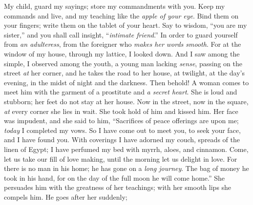 \begin{biblechapter} %
 My child, guard my sayings; 
store my commandments with you.
\verse Keep my commands and live, 
and my teaching like the \textit{apple of your eye}.
\verse Bind them on your fingers; 
write them on the tablet of your heart.
\verse Say to wisdom, “you are my sister,” 
and you shall call insight, “\textit{intimate friend}.”
\verse In order to guard yourself from \textit{an adulteress}, 
from the foreigner who \textit{makes her words smooth}.
\verse For at the window of my house, 
through my lattice, I looked down.
\verse And I saw among the simple, 
I observed among the youth, 
a young man lacking \textit{sense},
\verse passing on the street \textit{at} her corner, 
and he takes the road to her house,
\verse at twilight, at the day’s evening, 
in the midst of night and the darkness.
\verse Then behold! A woman comes to meet him 
with the garment of a prostitute and \textit{a secret heart}.
\verse She is loud and stubborn; 
her feet do not stay at her house.
\verse Now in the street, now in the square, 
\textit{at} every corner she lies in wait.
\verse She took hold of  him and kissed him. 
Her face was impudent, and she said to him,
\verse “Sacrifices of peace offerings are upon me; 
\textit{today} I completed my vows.
\verse So I have come out to meet you, 
to seek your face, and I have found you.
\verse With coverings I have adorned my couch, 
spreads of the linen of Egypt;
\verse I have perfumed my bed with myrrh, 
aloes, and cinnamon.
\verse Come, let us take our fill of love making, 
until the morning let us delight in love.
\verse For there is no man in his home; 
he has gone on a \textit{long journey}.
\verse The bag of money he took in his hand, 
for on the day of the full moon he will come home.”
\verse She persuades him with the greatness of her teachings; 
with her smooth lips she compels him.
\verse He goes after her suddenly; 

\end{biblechapter}
